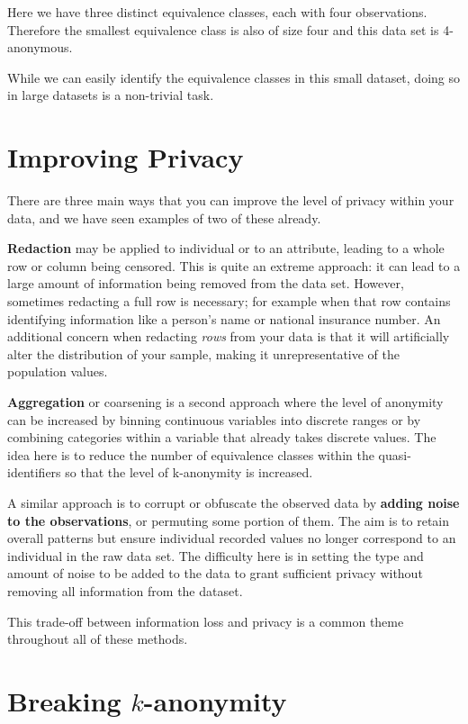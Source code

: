 \documentclass[
  letterpaper,
  DIV=11,
  numbers=noendperiod]{scrreprt}
\begin{document}
Here we have three distinct equivalence classes, each with four
observations. Therefore the smallest equivalence class is also of size
four and this data set is 4-anonymous.

While we can easily identify the equivalence classes in this small
dataset, doing so in large datasets is a non-trivial task.

\section{Improving Privacy}\label{improving-privacy}

There are three main ways that you can improve the level of privacy
within your data, and we have seen examples of two of these already.

\textbf{Redaction} may be applied to individual or to an attribute,
leading to a whole row or column being censored. This is quite an
extreme approach: it can lead to a large amount of information being
removed from the data set. However, sometimes redacting a full row is
necessary; for example when that row contains identifying information
like a person's name or national insurance number. An additional concern
when redacting \emph{rows} from your data is that it will artificially
alter the distribution of your sample, making it unrepresentative of the
population values.

\textbf{Aggregation} or coarsening is a second approach where the level
of anonymity can be increased by binning continuous variables into
discrete ranges or by combining categories within a variable that
already takes discrete values. The idea here is to reduce the number of
equivalence classes within the quasi-identifiers so that the level of
k-anonymity is increased.

A similar approach is to corrupt or obfuscate the observed data by
\textbf{adding noise to the observations}, or permuting some portion of
them. The aim is to retain overall patterns but ensure individual
recorded values no longer correspond to an individual in the raw data
set. The difficulty here is in setting the type and amount of noise to
be added to the data to grant sufficient privacy without removing all
information from the dataset.

This trade-off between information loss and privacy is a common theme
throughout all of these methods.

\section{\texorpdfstring{Breaking
\(k\)-anonymity}{Breaking k-anonymity}}\label{breaking-k-anonymity}
\end{document}
